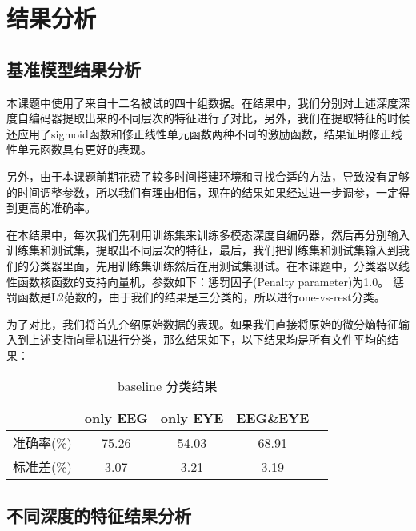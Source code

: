 
\chapter{结果分析}
\label{chap:chap7}
	
\section{基准模型结果分析}

	本课题中使用了来自十二名被试的四十组数据。在结果中，我们分别对上述深度深度自编码器提取出来的不同层次的特征进行了对比，另外，我们在提取特征的时候还应用了sigmoid函数和修正线性单元函数两种不同的激励函数，结果证明修正线性单元函数具有更好的表现。
	
	另外，由于本课题前期花费了较多时间搭建环境和寻找合适的方法，导致没有足够的时间调整参数，所以我们有理由相信，现在的结果如果经过进一步调参，一定得到更高的准确率。
	
	在本结果中，每次我们先利用训练集来训练多模态深度自编码器，然后再分别输入训练集和测试集，提取出不同层次的特征，最后，我们把训练集和测试集输入到我们的分类器里面，先用训练集训练然后在用测试集测试。在本课题中，分类器以线性函数核函数的支持向量机，参数如下：惩罚因子(Penalty parameter)为1.0。 惩罚函数是L2范数的，由于我们的结果是三分类的，所以进行one-vs-rest分类。
	
	为了对比，我们将首先介绍原始数据的表现。如果我们直接将原始的微分熵特征输入到上述支持向量机进行分类，那么结果如下，以下结果均是所有文件平均的结果：

	\begin{table}[!hbp]
	\centering
\begin{tabular}{|c|c|c|c|c|}
\hline
\hline
  & only EEG & only EYE & EEG\&EYE \\
\hline
准确率(\%) & 75.26 & 54.03 & 68.91\\
\hline
标准差(\%) & 3.07 & 3.21 & 3.19 \\
\hline
\end{tabular}
\caption{baseline 分类结果}
\end{table} 

\section{不同深度的特征结果分析}

